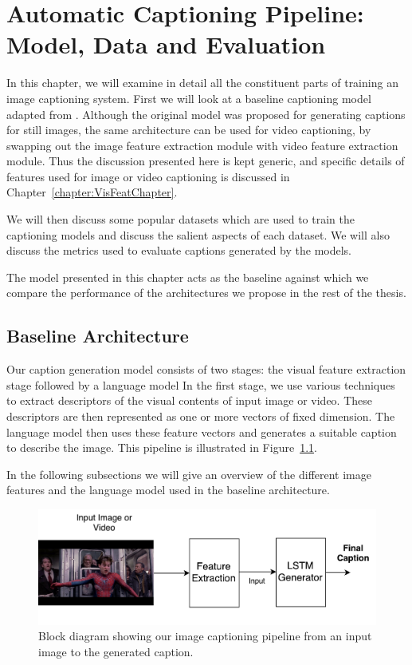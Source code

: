 \chapter{Automatic Captioning Pipeline: Model, Data and Evaluation}
\label{chapter:baseline}
In this chapter, we will examine in detail all the constituent parts
of training an image captioning system.
First we will look at a baseline captioning model adapted from
\cite{Vinyals_2015_CVPR}. 
Although the original model was proposed for generating captions for still
images, the same architecture can be used for video captioning, by
swapping out the image feature extraction module with video feature extraction
module.
Thus the discussion presented here is kept generic, and specific details of
features used for image or video captioning is discussed in
Chapter~\ref{chapter:VisFeatChapter}.

We will then discuss some popular datasets which are used to train the
captioning models and discuss the salient aspects of each dataset.
We will also discuss the metrics used to evaluate captions generated by the
models. 

The model presented in this chapter acts as the baseline against which we
compare the performance of the architectures we propose in the rest of the
thesis.

\section{Baseline Architecture} 

Our caption generation model consists of two stages: the visual
feature extraction stage followed by a language model
In the first stage, we use various techniques to extract descriptors of
the visual contents of input image or video.
These descriptors are then represented as one or more vectors of fixed
dimension.
The language model then uses these feature vectors and generates a
suitable caption to describe the image.
This pipeline is illustrated in Figure~\ref{fig_fullModel}. 

In the following subsections we will give an overview of the different image
features and the language model used in the baseline architecture.

\begin{figure}[t]
  \begin{center}
      \hspace{-10mm}\includegraphics[width=0.8\linewidth]{images/Thesis_generalBaseline.pdf}
  \end{center}
  \vspace*{-8mm}
  \caption{Block diagram showing our image captioning pipeline from an
  input image to the generated caption.}
  \label{fig_fullModel}
\end{figure}

